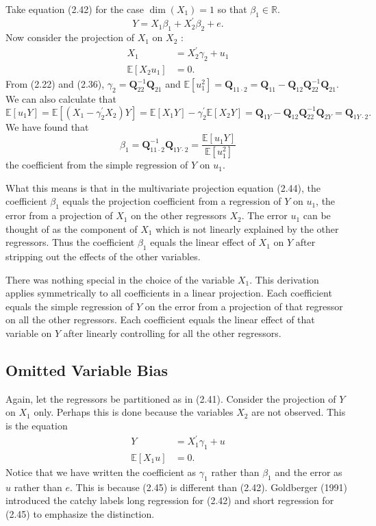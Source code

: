 \documentclass[10pt]{article}
\begin{document}
Take equation (2.42) for the case $\operatorname{dim}\left(X_{1}\right)=1$ so that $\beta_{1} \in \mathbb{R}$.
$$
Y=X_{1} \beta_{1}+X_{2}^{\prime} \beta_{2}+e .
$$
Now consider the projection of $X_{1}$ on $X_{2}$ :
$$
\begin{aligned}
X_{1} &=X_{2}^{\prime} \gamma_{2}+u_{1} \\
\mathbb{E}\left[X_{2} u_{1}\right] &=0 .
\end{aligned}
$$
From (2.22) and (2.36), $\gamma_{2}=\boldsymbol{Q}_{22}^{-1} \boldsymbol{Q}_{21}$ and $\mathbb{E}\left[u_{1}^{2}\right]=\boldsymbol{Q}_{11 \cdot 2}=\boldsymbol{Q}_{11}-\boldsymbol{Q}_{12} \boldsymbol{Q}_{22}^{-1} \boldsymbol{Q}_{21}$. We can also calculate that
$$
\mathbb{E}\left[u_{1} Y\right]=\mathbb{E}\left[\left(X_{1}-\gamma_{2}^{\prime} X_{2}\right) Y\right]=\mathbb{E}\left[X_{1} Y\right]-\gamma_{2}^{\prime} \mathbb{E}\left[X_{2} Y\right]=\boldsymbol{Q}_{1 Y}-\boldsymbol{Q}_{12} \boldsymbol{Q}_{22}^{-1} \boldsymbol{Q}_{2 Y}=\boldsymbol{Q}_{1 Y \cdot 2} .
$$
We have found that
$$
\beta_{1}=\boldsymbol{Q}_{11 \cdot 2}^{-1} \boldsymbol{Q}_{1 Y \cdot 2}=\frac{\mathbb{E}\left[u_{1} Y\right]}{\mathbb{E}\left[u_{1}^{2}\right]}
$$
the coefficient from the simple regression of $Y$ on $u_{1}$.

What this means is that in the multivariate projection equation (2.44), the coefficient $\beta_{1}$ equals the projection coefficient from a regression of $Y$ on $u_{1}$, the error from a projection of $X_{1}$ on the other regressors $X_{2}$. The error $u_{1}$ can be thought of as the component of $X_{1}$ which is not linearly explained by the other regressors. Thus the coefficient $\beta_{1}$ equals the linear effect of $X_{1}$ on $Y$ after stripping out the effects of the other variables.

There was nothing special in the choice of the variable $X_{1}$. This derivation applies symmetrically to all coefficients in a linear projection. Each coefficient equals the simple regression of $Y$ on the error from a projection of that regressor on all the other regressors. Each coefficient equals the linear effect of that variable on $Y$ after linearly controlling for all the other regressors.

\subsection{Omitted Variable Bias}
Again, let the regressors be partitioned as in (2.41). Consider the projection of $Y$ on $X_{1}$ only. Perhaps this is done because the variables $X_{2}$ are not observed. This is the equation
$$
\begin{aligned}
Y &=X_{1}^{\prime} \gamma_{1}+u \\
\mathbb{E}\left[X_{1} u\right] &=0 .
\end{aligned}
$$
Notice that we have written the coefficient as $\gamma_{1}$ rather than $\beta_{1}$ and the error as $u$ rather than $e$. This is because (2.45) is different than (2.42). Goldberger (1991) introduced the catchy labels long regression for (2.42) and short regression for (2.45) to emphasize the distinction.
\end{document}
